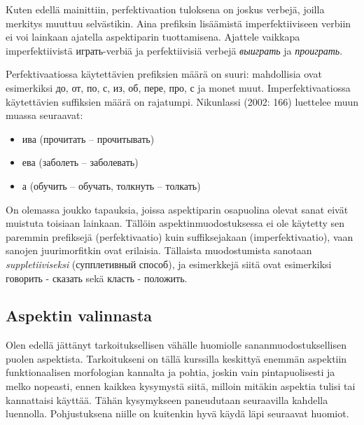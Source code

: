 \documentclass[]{scrartcl}
\providecommand{\tightlist}{%
  \setlength{\itemsep}{0pt}\setlength{\parskip}{0pt}}
\begin{document}
Kuten edellä mainittiin, perfektivaation tuloksena on joskus verbejä,
joilla merkitys muuttuu selvästikin. Aina prefiksin lisäämistä
imperfektiiviseen verbiin ei voi lainkaan ajatella aspektiparin
tuottamisena. Ajattele vaikkapa imperfektiivistä играть-verbiä ja
perfektiivisiä verbejä \emph{выиграть} ja \emph{проиграть}.

Perfektivaatiossa käytettävien prefiksien määrä on suuri: mahdollisia
ovat esimerkiksi до, от, по, с, из, об, пере, про, с ja monet muut.
Imperfektivaatiossa käytettävien suffiksien määrä on rajatumpi.
Nikunlassi (2002: 166) luettelee muun muassa seuraavat:

\begin{itemize}
\tightlist
\item
  ива (прочитать -- прочитывать)
\item
  ева (заболеть -- заболевать)
\item
  а (обучить -- обучать, толкнуть -- толкать)
\end{itemize}

On olemassa joukko tapauksia, joissa aspektiparin osapuolina olevat
sanat eivät muistuta toisiaan lainkaan. Tällöin aspektinmuodostuksessa
ei ole käytetty sen paremmin prefiksejä (perfektivaatio) kuin
suffiksejakaan (imperfektivaatio), vaan sanojen juurimorfitkin ovat
erilaisia. Tällaista muodostumista sanotaan \emph{suppletiiviseksi}
(супплетивный способ), ja esimerkkejä siitä ovat esimerkiksi говорить -
сказать sekä класть - положить.

\subsection{Aspektin valinnasta}\label{aspektin-valinnasta}

Olen edellä jättänyt tarkoituksellisen vähälle huomiolle
sananmuodostuksellisen puolen aspektista. Tarkoitukseni on tällä
kurssilla keskittyä enemmän aspektiin funktionaalisen morfologian
kannalta ja pohtia, joskin vain pintapuolisesti ja melko nopeasti, ennen
kaikkea kysymystä siitä, milloin mitäkin aspektia tulisi tai kannattaisi
käyttää. Tähän kysymykseen paneudutaan seuraavilla kahdella luennolla.
Pohjustuksena niille on kuitenkin hyvä käydä läpi seuraavat huomiot.
\end{document}
